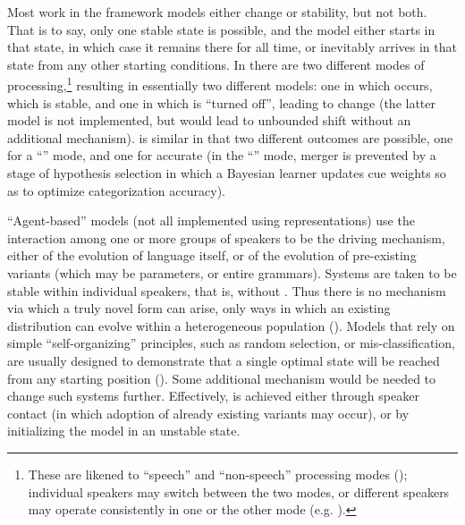 Most work in the  framework models either change or stability,
but not both. That is to say, only one stable state is possible, and
the model either starts in that state, in which case it remains there
for all time, or inevitably arrives in that state from any other starting
conditions. In \citet{Garrett2013} there are two different modes
of processing,\footnote{These are likened to “speech” and “non-speech” processing
modes (\citealt{liberman1967perception}); individual speakers may
switch between the two modes, or different speakers may operate consistently
in one or the other mode (e.g. \citealt{yu2013socio}). } resulting in essentially two different models: one in which 
occurs, which is stable, and one in which  is “turned
off”, leading to change (the latter model is not implemented, but
would lead to unbounded shift without an additional mechanism). \citet{Kirby2014}
is similar in that two different outcomes are possible, one for a
``'' mode, and one for accurate  (in the ``''
mode, merger is prevented by a stage of hypothesis selection in which
a Bayesian learner updates  cue weights so as to optimize
categorization accuracy). 

“Agent-based” models (not all implemented using  representations)
use the interaction among one or more groups of speakers to be the
driving mechanism, either of the evolution of language itself, or
of the evolution of pre-existing variants (which may be parameters,
or entire grammars). Systems are taken to be stable within individual
speakers, that is, without . Thus there is no mechanism via which
a truly novel form can arise, only ways in which an existing distribution
can evolve within a heterogeneous population (\citealt{Niyogi1997,Boer2000,nowak2001evolution,Steels2005,baxter2006utterance,oudeyer2006self,fagyal2010centers,stanford2013revisiting,pierrehumbert2014model}).
Models that rely on simple ``self-organizing'' principles, such as random
selection, or mis-classification, are usually designed to demonstrate
that a single optimal state will be reached from any starting position
(\citealp{Wedela,ettlinger2007exemplar,Wedel2006,Blevins2009,DBLP:journals/corr/Tupper14a,wedel2017category}).
Some additional mechanism would be needed to change such systems further.
Effectively,  is achieved either through speaker contact
(in which adoption of already existing variants may occur), or by
initializing the model in an unstable state. 


